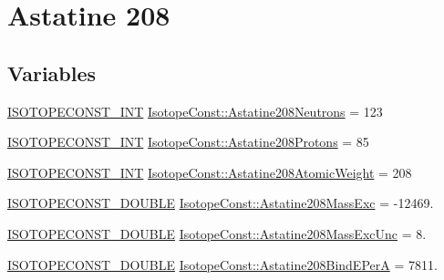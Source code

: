 \hypertarget{group___isotope_const-_astatine-_at208}{}\section{Astatine 208}
\label{group___isotope_const-_astatine-_at208}
\subsection*{Variables}
\begin{DoxyCompactItemize}
\item 
\mbox{\hyperlink{group___isotope_const-_macros_ga5f18360b3e99483a35c32d789e62621c}{I\+S\+O\+T\+O\+P\+E\+C\+O\+N\+S\+T\+\_\+\+I\+NT}} \mbox{\hyperlink{group___isotope_const-_astatine-_at208_ga2466c382bd3533863ec91e6966726ab2}{Isotope\+Const\+::\+Astatine208\+Neutrons}} = 123
\item 
\mbox{\hyperlink{group___isotope_const-_macros_ga5f18360b3e99483a35c32d789e62621c}{I\+S\+O\+T\+O\+P\+E\+C\+O\+N\+S\+T\+\_\+\+I\+NT}} \mbox{\hyperlink{group___isotope_const-_astatine-_at208_ga5696dd1616761d59203254fa1abe5b9d}{Isotope\+Const\+::\+Astatine208\+Protons}} = 85
\item 
\mbox{\hyperlink{group___isotope_const-_macros_ga5f18360b3e99483a35c32d789e62621c}{I\+S\+O\+T\+O\+P\+E\+C\+O\+N\+S\+T\+\_\+\+I\+NT}} \mbox{\hyperlink{group___isotope_const-_astatine-_at208_ga2c23b69beeecca0b509d4b24ab98320a}{Isotope\+Const\+::\+Astatine208\+Atomic\+Weight}} = 208
\item 
\mbox{\hyperlink{group___isotope_const-_macros_ga8f45a7272ce02c0b4c65c44636ed719a}{I\+S\+O\+T\+O\+P\+E\+C\+O\+N\+S\+T\+\_\+\+D\+O\+U\+B\+LE}} \mbox{\hyperlink{group___isotope_const-_astatine-_at208_ga22e50bf466d07045869b0fca3bf87e0b}{Isotope\+Const\+::\+Astatine208\+Mass\+Exc}} = -\/12469.
\item 
\mbox{\hyperlink{group___isotope_const-_macros_ga8f45a7272ce02c0b4c65c44636ed719a}{I\+S\+O\+T\+O\+P\+E\+C\+O\+N\+S\+T\+\_\+\+D\+O\+U\+B\+LE}} \mbox{\hyperlink{group___isotope_const-_astatine-_at208_ga62f9965dbf43196bc956df026e449697}{Isotope\+Const\+::\+Astatine208\+Mass\+Exc\+Unc}} = 8.
\item 
\mbox{\hyperlink{group___isotope_const-_macros_ga8f45a7272ce02c0b4c65c44636ed719a}{I\+S\+O\+T\+O\+P\+E\+C\+O\+N\+S\+T\+\_\+\+D\+O\+U\+B\+LE}} \mbox{\hyperlink{group___isotope_const-_astatine-_at208_ga7b56594f9fcbb1eb86912de64ecc628f}{Isotope\+Const\+::\+Astatine208\+Bind\+E\+PerA}} = 7811.
\item 

\end{DoxyCompactItemize}
